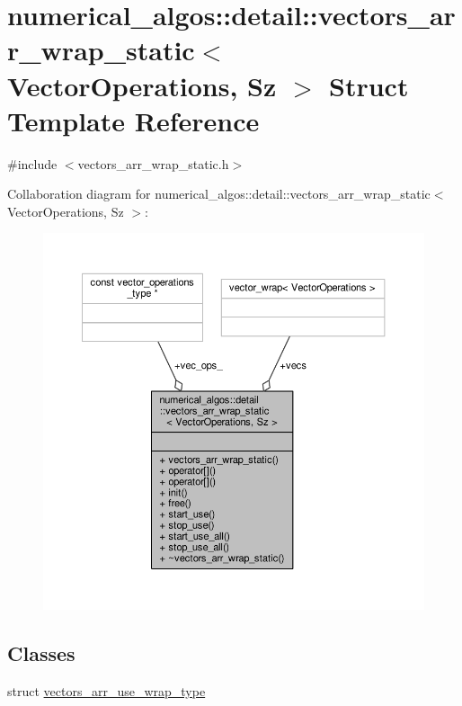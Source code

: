 \hypertarget{structnumerical__algos_1_1detail_1_1vectors__arr__wrap__static}{\section{numerical\-\_\-algos\-:\-:detail\-:\-:vectors\-\_\-arr\-\_\-wrap\-\_\-static$<$ Vector\-Operations, Sz $>$ Struct Template Reference}
\label{structnumerical__algos_1_1detail_1_1vectors__arr__wrap__static}
}


{\ttfamily \#include $<$vectors\-\_\-arr\-\_\-wrap\-\_\-static.\-h$>$}



Collaboration diagram for numerical\-\_\-algos\-:\-:detail\-:\-:vectors\-\_\-arr\-\_\-wrap\-\_\-static$<$ Vector\-Operations, Sz $>$\-:\nopagebreak
\begin{figure}[H]
\begin{center}
\leavevmode
\includegraphics[width=350pt]{structnumerical__algos_1_1detail_1_1vectors__arr__wrap__static__coll__graph}
\end{center}
\end{figure}
\subsection*{Classes}
\begin{DoxyCompactItemize}
\item 
struct \hyperlink{structnumerical__algos_1_1detail_1_1vectors__arr__wrap__static_1_1vectors__arr__use__wrap__type}{vectors\-\_\-arr\-\_\-use\-\_\-wrap\-\_\-type}
\end{DoxyCompactItemize}
